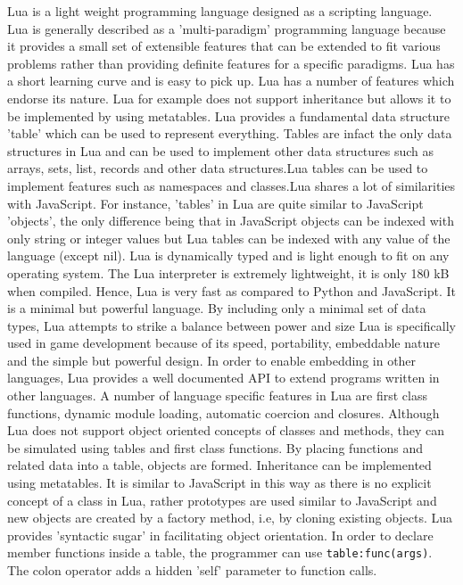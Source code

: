 Lua is a light weight programming language designed as a scripting language. Lua is generally described as a 'multi-paradigm' programming language because it provides a small set of extensible features that can be extended to fit various problems rather than providing definite features for a specific paradigms. Lua has a short learning curve and is easy to pick up. Lua has a number of features which endorse its  nature. Lua for example does not support inheritance but allows it to be implemented by using metatables.
Lua provides a fundamental data structure 'table' which can be used to represent everything. Tables are infact the only data structures in Lua and can be used to implement other data structures such as arrays, sets, list, records and other data structures.Lua tables can be used to implement features such as namespaces and classes.Lua shares a lot of similarities with JavaScript. For instance, 'tables' in Lua are quite similar to JavaScript 'objects', the only difference being that in JavaScript objects can be indexed with only string or integer values but Lua tables can be indexed with any value of the language (except nil). 
Lua is dynamically typed and is light enough to fit on any operating system. The Lua interpreter is extremely lightweight, it is only 180 kB when compiled. Hence, Lua is very fast as compared to Python and JavaScript. It is a minimal but powerful language. By including only a minimal set of data types, Lua attempts to strike a balance between power and size \cite{about_lua}
Lua is specifically used in game development because of its speed, portability, embeddable nature and the simple but powerful design. In order to enable embedding in other languages, Lua provides a well documented API to extend programs written in other languages. 
A number of language specific features in Lua are first class functions, dynamic module loading, automatic coercion and closures. Although Lua does not support object oriented concepts of classes and methods, they can be simulated using tables and first class functions. By placing functions and related data into a table, objects are formed. Inheritance can be implemented  using metatables. It is similar to JavaScript in this way as there is no explicit concept of a class in Lua, rather prototypes are used similar to JavaScript and new objects are created by a factory method, i.e, by cloning existing objects. Lua provides 'syntactic sugar' in facilitating object orientation. In order to declare member functions inside a table, the programmer can use \texttt{table:func(args)}. The colon operator adds a hidden 'self' parameter to function calls.
